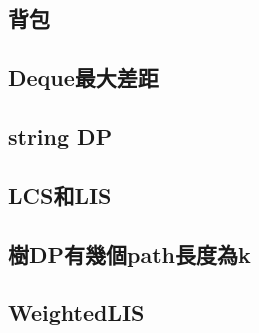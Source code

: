     \subsection{背包}
    \subsection{Deque最大差距}
    \subsection{string DP}
        
    \subsection{LCS和LIS}
    \subsection{樹DP有幾個path長度為k}
        
    \subsection{WeightedLIS}
        

%     
    

%         
